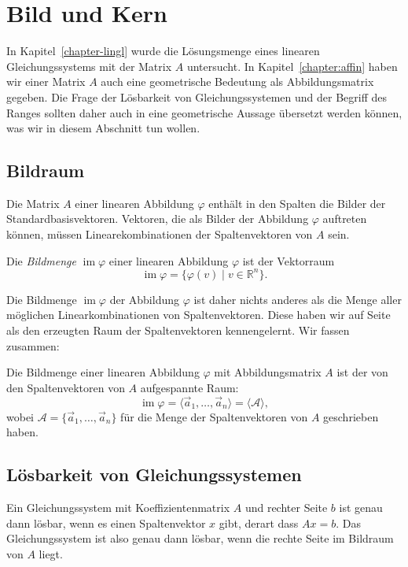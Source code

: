 %
%
%
\section{Bild und Kern\label{section:bildundkern}}
In Kapitel~\ref{chapter-lingl} wurde die Lösungsmenge eines linearen
Gleichungssystems mit der Matrix $A$ untersucht.
In Kapitel~\ref{chapter:affin} 
haben wir einer Matrix $A$ auch eine geometrische Bedeutung
als Abbildungsmatrix gegeben.
Die Frage der Lösbarkeit von Gleichungssystemen und der Begriff des
Ranges sollten daher auch in eine geometrische Aussage übersetzt
werden können, was wir in diesem Abschnitt tun wollen.

\subsection{Bildraum}
Die Matrix $A$ einer linearen Abbildung $\varphi$ enthält in den Spalten
die Bilder der Standardbasisvektoren.
Vektoren, die als Bilder der Abbildung $\varphi$ auftreten können,
müssen Linearekombinationen der Spaltenvektoren von $A$ sein.
\begin{definition}
Die {\em Bildmenge} $\operatorname{im}\varphi$ einer linearen Abbildung
$\varphi$ ist der Vektorraum
\[
\operatorname{im}\varphi
=
\{\varphi(v)\;|\;v\in\mathbb R^n\}.
\]
\end{definition}

Die Bildmenge $\operatorname{im}\varphi$ der Abbildung $\varphi$ ist
daher nichts anderes als die Menge aller möglichen Linearkombinationen
von Spaltenvektoren.
Diese haben wir auf Seite \pageref{skript:affin:koordinaten:aufgespannt}
als den erzeugten Raum der Spaltenvektoren kennengelernt.
Wir fassen zusammen:
\begin{satz}
Die Bildmenge einer linearen Abbildung $\varphi$ mit Abbildungsmatrix $A$
ist der von den Spaltenvektoren von $A$ aufgespannte Raum:
\[
\operatorname{im}\varphi
=
\langle\vec{a}_1,\dots,\vec{a}_n\rangle
=
\langle\mathcal{A}\rangle,
\]
wobei $\mathcal{A}=\{\vec{a}_1,\dots,\vec{a}_n\}$
für die Menge der Spaltenvektoren von $A$ geschrieben haben.
\end{satz}

\subsection{Lösbarkeit von Gleichungssystemen}
Ein Gleichungssystem mit Koeffizientenmatrix $A$ und rechter Seite $b$
ist genau dann lösbar, wenn es einen Spaltenvektor $x$ gibt, derart
dass $Ax=b$.
Das Gleichungssystem ist also genau dann lösbar, wenn die rechte Seite
im Bildraum von $A$ liegt.

